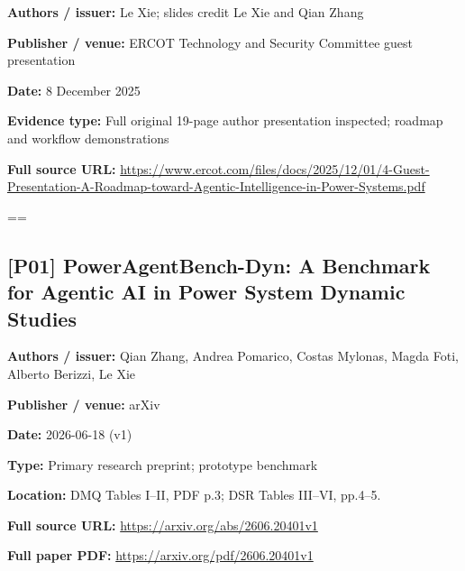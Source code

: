 \documentclass[10pt,letterpaper]{article}
\begin{document}
\textbf{Authors / issuer:} Le Xie; slides credit Le Xie and Qian Zhang\par
\textbf{Publisher / venue:} ERCOT Technology and Security Committee guest presentation\par
\textbf{Date:} 8 December 2025\par
\textbf{Evidence type:} Full original 19-page author presentation inspected; roadmap and workflow demonstrations\par
\textbf{Full source URL:} \href{https://www.ercot.com/files/docs/2025/12/01/4-Guest-Presentation-A-Roadmap-toward-Agentic-Intelligence-in-Power-Systems.pdf}{\small\ttfamily https:/\allowbreak{}/\allowbreak{}www.\allowbreak{}ercot.\allowbreak{}com/\allowbreak{}files/\allowbreak{}docs/\allowbreak{}2025/\allowbreak{}12/\allowbreak{}01/\allowbreak{}4-\allowbreak{}Guest-\allowbreak{}Presentation-\allowbreak{}A-\allowbreak{}Roadmap-\allowbreak{}toward-\allowbreak{}Agentic-\allowbreak{}Intelligence-\allowbreak{}in-\allowbreak{}Power-\allowbreak{}Systems.\allowbreak{}pdf}\par
\egroup\par\noindent\box\readingEntry\par\medskip
\setbox\readingEntry=\vbox\bgroup\hsize=\linewidth\subsection*{[P01] PowerAgentBench-Dyn: A Benchmark for Agentic AI in Power System Dynamic Studies}
\textbf{Authors / issuer:} Qian Zhang, Andrea Pomarico, Costas Mylonas, Magda Foti, Alberto Berizzi, Le Xie\par
\textbf{Publisher / venue:} arXiv\par
\textbf{Date:} 2026-06-18 (v1)\par
\textbf{Type:} Primary research preprint; prototype benchmark\par
\textbf{Location:} DMQ Tables I--II, PDF p.3; DSR Tables III--VI, pp.4--5.\par
\textbf{Full source URL:} \href{https://arxiv.org/abs/2606.20401v1}{\small\ttfamily https:/\allowbreak{}/\allowbreak{}arxiv.\allowbreak{}org/\allowbreak{}abs/\allowbreak{}2606.\allowbreak{}20401v1}\par
\textbf{Full paper PDF:} \href{https://arxiv.org/pdf/2606.20401v1}{\small\ttfamily https:/\allowbreak{}/\allowbreak{}arxiv.\allowbreak{}org/\allowbreak{}pdf/\allowbreak{}2606.\allowbreak{}20401v1}\par
\egroup\par\noindent\box\readingEntry\par\medskip
\end{document}

